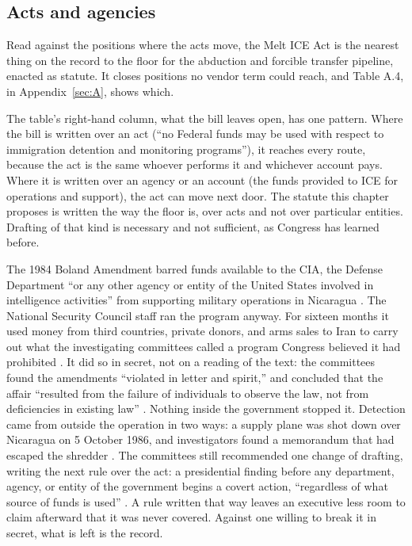 \subsection{Acts and agencies}
\label{sec:11.4.1}
Read against the positions where the acts move, the Melt ICE Act is the nearest thing on the record to the floor for the abduction and forcible transfer pipeline, enacted as statute. It closes positions no vendor term could reach, and Table A.4, in Appendix~\ref{sec:A}, shows which.

The table's right-hand column, what the bill leaves open, has one pattern. Where the bill is written over an act (“no Federal funds may be used with respect to immigration detention and monitoring programs”), it reaches every route, because the act is the same whoever performs it and whichever account pays. Where it is written over an agency or an account (the funds provided to ICE for operations and support), the act can move next door.
The statute this chapter proposes is written the way the floor is, over acts and not over particular entities. Drafting of that kind is necessary and not sufficient, as Congress has learned before.

The 1984 Boland Amendment barred funds available to the CIA, the Defense Department “or any other agency or entity of the United States involved in intelligence activities” from supporting military operations in Nicaragua \autocite[§8066(a)]{boland1984}. The National Security Council staff ran the program anyway. For sixteen months it used money from third countries, private donors, and arms sales to Iran to carry out what the investigating committees called a program Congress believed it had prohibited \autocite{irancontra1987}. It did so in secret, not on a reading of the text: the committees found the amendments “violated in letter and spirit,” and concluded that the affair “resulted from the failure of individuals to observe the law, not from deficiencies in existing law” \autocite[344, 362]{irancontra1987}. Nothing inside the government stopped it. Detection came from outside the operation in two ways: a supply plane was shot down over Nicaragua on 5 October 1986, and investigators found a memorandum that had escaped the shredder \autocite{irancontra1987}. The committees still recommended one change of drafting, writing the next rule over the act: a presidential finding before any department, agency, or entity of the government begins a covert action, “regardless of what source of funds is used” \autocite[363]{irancontra1987}. A rule written that way leaves an executive less room to claim afterward that it was never covered. Against one willing to break it in secret, what is left is the record.

